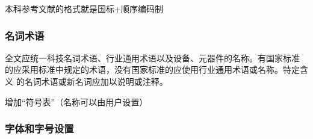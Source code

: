 \begin{points}
  \item 本科参考文献的格式就是国标+顺序编码制
\end{points}



\subsubsection{名词术语}

\begin{reference}
  全文应统一科技名词术语、行业通用术语以及设备、元器件的名称。有国家标准 的应采用标准中规定的术语，没有国家标准的应使用行业通用术语或名称。特定含义 的名词术语或新名词应加以说明或注释。
\end{reference}

\begin{points}
  \item 增加“符号表”（名称可以由用户设置）
\end{points}


\subsubsection{字体和字号设置}


